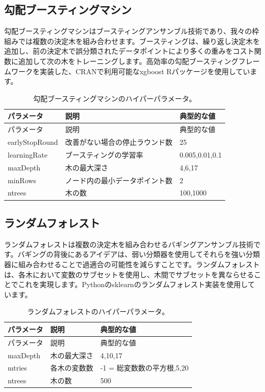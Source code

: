 \documentclass[
  11pt]{book}
\theoremstyle{definition}
\theoremstyle{definition}
\theoremstyle{definition}
\theoremstyle{definition}
\theoremstyle{remark}
\begin{document}
\subsection{勾配ブースティングマシン}\label{ux52feux914dux30d6ux30fcux30b9ux30c6ux30a3ux30f3ux30b0ux30deux30b7ux30f3}

勾配ブースティングマシンはブースティングアンサンブル技術であり、我々の枠組みでは複数の決定木を組み合わせます。ブースティングは、繰り返し決定木を追加し、前の決定木で誤分類されたデータポイントにより多くの重みをコスト関数に追加して次の木をトレーニングします。高効率の勾配ブースティングフレームワークを実装した、CRANで利用可能なxgboost Rパッケージを使用しています。  

\begin{longtable}[]{@{}lll@{}}
\caption{\label{tab:gbmParameters} 勾配ブースティングマシンのハイパーパラメータ。}\tabularnewline
\toprule\noalign{}
パラメータ & 説明 & 典型的な値 \\
\midrule\noalign{}
\endfirsthead
\toprule\noalign{}
パラメータ & 説明 & 典型的な値 \\
\midrule\noalign{}
\endhead
\bottomrule\noalign{}
\endlastfoot
earlyStopRound & 改善がない場合の停止ラウンド数 & 25 \\
learningRate & ブースティングの学習率 & 0.005,0.01,0.1 \\
maxDepth & 木の最大深さ & 4,6,17 \\
minRows & ノード内の最小データポイント数 & 2 \\
ntrees & 木の数 & 100,1000 \\
\end{longtable}

\subsection{ランダムフォレスト}\label{ux30e9ux30f3ux30c0ux30e0ux30d5ux30a9ux30ecux30b9ux30c8}

ランダムフォレストは複数の決定木を組み合わせるバギングアンサンブル技術です。バギングの背後にあるアイデアは、弱い分類器を使用してそれらを強い分類器に組み合わせることで過適合の可能性を減らすことです。ランダムフォレストは、各木において変数のサブセットを使用し、木間でサブセットを異ならせることでこれを実現します。Pythonのsklearnのランダムフォレスト実装を使用しています。   

\begin{longtable}[]{@{}lll@{}}
\caption{\label{tab:randomForestParameters} ランダムフォレストのハイパーパラメータ。}\tabularnewline
\toprule\noalign{}
パラメータ & 説明 & 典型的な値 \\
\midrule\noalign{}
\endfirsthead
\toprule\noalign{}
パラメータ & 説明 & 典型的な値 \\
\midrule\noalign{}
\endhead
\bottomrule\noalign{}
\endlastfoot
maxDepth & 木の最大深さ & 4,10,17 \\
mtries & 各木の変数数 & -1 = 総変数数の平方根,5,20 \\
ntrees & 木の数 & 500 \\
\end{longtable}
\end{document}
